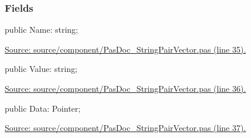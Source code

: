 \documentclass{report}
\newif\ifpdf
\begin{document}
\subsubsection*{\large{\textbf{Fields}}\normalsize\hspace{1ex}\hfill}
\begin{list}{}{
\setlength{\itemindent}{0cm}
\setlength{\listparindent}{0cm}
\setlength{\leftmargin}{\evensidemargin}
\addtolength{\leftmargin}{\tmplength}
\settowidth{\labelsep}{X}
\addtolength{\leftmargin}{\labelsep}
\setlength{\labelwidth}{\tmplength}
}
\label{PasDoc_StringPairVector.TStringPair-Name}
\item[\textbf{Name}\hfill]
\ifpdf
\begin{flushleft}
\fi
\begin{ttfamily}
public Name: string;\end{ttfamily}

\ifpdf
\end{flushleft}
\fi


\par  \par
\href{https://github.com/pasdoc/pasdoc/blob/master/source/component/PasDoc_StringPairVector.pas#L35}{Source: source/component/PasDoc{\_}StringPairVector.pas (line 35).}\label{PasDoc_StringPairVector.TStringPair-Value}
\item[\textbf{Value}\hfill]
\ifpdf
\begin{flushleft}
\fi
\begin{ttfamily}
public Value: string;\end{ttfamily}

\ifpdf
\end{flushleft}
\fi


\par  \par
\href{https://github.com/pasdoc/pasdoc/blob/master/source/component/PasDoc_StringPairVector.pas#L36}{Source: source/component/PasDoc{\_}StringPairVector.pas (line 36).}\label{PasDoc_StringPairVector.TStringPair-Data}
\item[\textbf{Data}\hfill]
\ifpdf
\begin{flushleft}
\fi
\begin{ttfamily}
public Data: Pointer;\end{ttfamily}

\ifpdf
\end{flushleft}
\fi


\par  \par
\href{https://github.com/pasdoc/pasdoc/blob/master/source/component/PasDoc_StringPairVector.pas#L37}{Source: source/component/PasDoc{\_}StringPairVector.pas (line 37).}\end{list}
\end{document}
